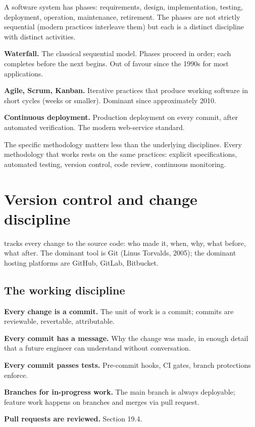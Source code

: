 A software system has phases: requirements, design, implementation, testing, deployment, operation, maintenance, retirement. The phases are not strictly sequential (modern practices interleave them) but each is a distinct discipline with distinct activities.

\textbf{Waterfall.} The classical sequential model. Phases proceed in order; each completes before the next begins. Out of favour since the 1990s for most applications.

\textbf{Agile, Scrum, Kanban.} Iterative practices that produce working software in short cycles (weeks or smaller). Dominant since approximately 2010.

\textbf{Continuous deployment.} Production deployment on every commit, after automated verification. The modern web-service standard.

The specific methodology matters less than the underlying disciplines. Every methodology that works rests on the same practices: explicit specifications, automated testing, version control, code review, continuous monitoring.

\section{Version control and change discipline}

 tracks every change to the source code: who made it, when, why, what before, what after. The dominant tool is Git (Linus Torvalds, 2005); the dominant hosting platforms are GitHub, GitLab, Bitbucket.

\subsection{The working discipline}

\textbf{Every change is a commit.} The unit of work is a commit; commits are reviewable, revertable, attributable.

\textbf{Every commit has a message.} Why the change was made, in enough detail that a future engineer can understand without conversation.

\textbf{Every commit passes tests.} Pre-commit hooks, CI gates, branch protections enforce.

\textbf{Branches for in-progress work.} The main branch is always deployable; feature work happens on branches and merges via pull request.

\textbf{Pull requests are reviewed.} Section 19.4.

